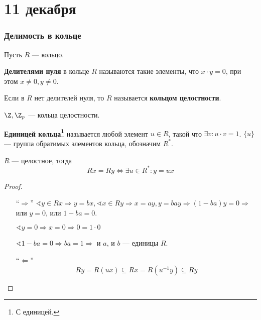 \chapter{11 декабря}

\subsection{Делимость в кольце}

Пусть \(R\) --- кольцо.

\begin{definition}
    \textbf{Делителями нуля} в кольце \(R\) называются такие элементы, что \(x \cdot y = 0\), при этом \(x \neq 0, y \neq 0\).
\end{definition}

\begin{remark}
    Если в \(R\) нет делителей нуля, то \(R\) называется \textbf{кольцом целостности}.
\end{remark}

\begin{example}
    \(\Z, \Z_p\) --- кольца целостности.
\end{example}

\begin{definition}
    \textbf{Единицей кольца\footnote{С единицей.}} называется любой элемент \(u \in R\), такой что \(\exists v : u \cdot v = 1\).
    \(\{u\}\) --- группа обратимых элементов кольца, обозначим \(R^*\).
\end{definition}

\begin{lemma}
    \(R\) --- целостное, тогда
    \[Rx = Ry \Leftrightarrow \exists u \in R^* : y = ux\]
\end{lemma}
\begin{proof}\itemfix
    \begin{itemize}
        \item [``\(\Rightarrow\)''] \(\sphericalangle y \in Rx \Rightarrow y = bx, \sphericalangle x \in Ry \Rightarrow x = ay, y = bay \Rightarrow (1 - ba)y = 0 \Rightarrow \) или \(y = 0\), или \(1 - ba = 0\).

              \(\sphericalangle y = 0 \Rightarrow x = 0 \Rightarrow 0 = 1 \cdot 0\)

              \(\sphericalangle 1 - ba = 0 \Rightarrow ba = 1 \Rightarrow\) и \(a\), и \(b\) --- единицы \(R\).
        \item [``\(\Leftarrow\)''] \[Ry = R(ux) \subseteq Rx = R(u^{-1}y) \subseteq Ry\]
    \end{itemize}
\end{proof}

